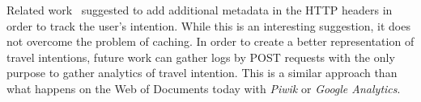 \documentclass{sig-alternate}
\begin{document}
Related work~\cite{verborgh2014lonesome} suggested to add additional metadata in the HTTP headers in order to track the user's intention.
While this is an interesting suggestion, it does not overcome the problem of caching.
In order to create a better representation of travel intentions, future work can gather logs by POST requests with the only purpose to gather analytics of travel intention.
This is a similar approach than what happens on the Web of Documents today with \emph{Piwik} or \emph{Google Analytics}.

\let\oldsection\section
\renewcommand{\section}[2][1]{\oldsection{#1}\vspace{-3pt}}



\end{document}
